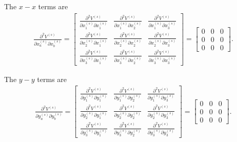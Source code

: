 The $x-x$ terms are 
%
\begin{eqnarray}
\frac{\partial^2V^{(s)}}{\partial x_a^{(s)} \partial x_b^{(s)}} = 
\begin{bmatrix}
\frac{\partial^2V^{(s)}}{\partial x_1^{(s)} \partial x_1^{(s)}} & \frac{\partial^2V^{(s)}}{\partial x_1^{(s)} \partial x_2^{(s)}}  & \frac{\partial^2V^{(s)}}{\partial x_1^{(s)} \partial x_3^{(s)}} \\
%
\frac{\partial^2V^{(s)}}{\partial x_2^{(s)} \partial x_1^{(s)}} & \frac{\partial^2V^{(s)}}{\partial x_2^{(s)} \partial x_2^{(s)}}  & \frac{\partial^2V^{(s)}}{\partial x_2^{(s)} \partial x_3^{(s)}} \\
%
\frac{\partial^2V^{(s)}}{\partial x_3^{(s)} \partial x_1^{(s)}} & \frac{\partial^2V^{(s)}}{\partial x_3^{(s)} \partial x_2^{(s)}}  & \frac{\partial^2V^{(s)}}{\partial x_3^{(s)} \partial x_3^{(s)}}
\end{bmatrix} =
\begin{bmatrix}
0 & 0 & 0 \\
0 & 0 & 0 \\
0 & 0 & 0
\end{bmatrix}.
\end{eqnarray}
%

The $y-y$ terms are
%
\begin{eqnarray}
\frac{\partial^2V^{(s)}}{\partial y_a^{(s)} \partial y_b^{(s)}} = 
\begin{bmatrix}
\frac{\partial^2V^{(s)}}{\partial y_1^{(s)} \partial y_1^{(s)}} & \frac{\partial^2V^{(s)}}{\partial y_1^{(s)} \partial y_2^{(s)}}  & \frac{\partial^2V^{(s)}}{\partial y_1^{(s)} \partial y_3^{(s)}} \\
%
\frac{\partial^2V^{(s)}}{\partial y_2^{(s)} \partial y_1^{(s)}} & \frac{\partial^2V^{(s)}}{\partial y_2^{(s)} \partial y_2^{(s)}}  & \frac{\partial^2V^{(s)}}{\partial y_2^{(s)} \partial y_3^{(s)}} \\
%
\frac{\partial^2V^{(s)}}{\partial y_3^{(s)} \partial y_1^{(s)}} & \frac{\partial^2V^{(s)}}{\partial y_3^{(s)} \partial y_2^{(s)}}  & \frac{\partial^2V^{(s)}}{\partial y_3^{(s)} \partial y_3^{(s)}}
\end{bmatrix} =
\begin{bmatrix}
0 & 0 & 0 \\
0 & 0 & 0 \\
0 & 0 & 0
\end{bmatrix}.
\end{eqnarray}
%

